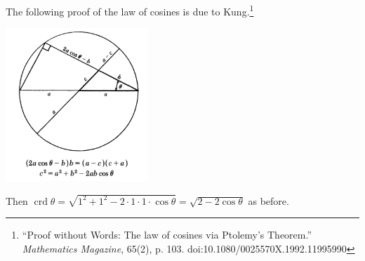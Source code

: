 \documentclass[a4paper,leqno]{article}
\numberwithin{equation}{section}
\theoremstyle{definition}
\theoremstyle{remark}
\DeclareMathOperator{\crd}{crd}
\begin{document}
The following proof of the law of cosines is due to Kung.\footnote{``Proof without Words: The law of cosines via Ptolemy's Theorem.'' \textit{Mathematics Magazine}, 65(2), p. 103. doi:10.1080/0025570X.1992.11995990}
\begin{center}
  \includegraphics[width=0.4\textwidth]{cosinelawproof}
\end{center}

Then $ \crd \theta = \sqrt{1^2 + 1^2 - 2\cdot1\cdot1\cdot \cos \theta} = \sqrt{2 - 2\cos \theta} $ as before.
\end{document}

